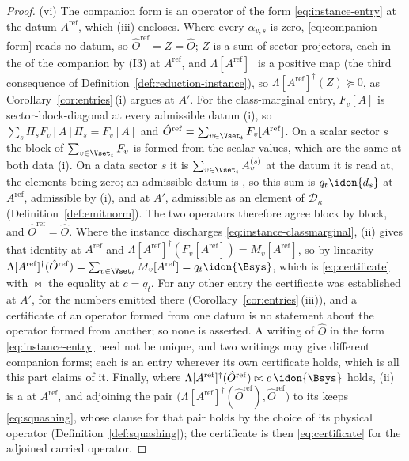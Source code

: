 \begin{proof}
(vi) The companion form is an operator of the form
\eqref{eq:instance-entry} at the datum $A^{\mathrm{ref}}$, which
(iii) encloses. Where every $\alpha_{v,s}$ is zero, \eqref{eq:companion-form}
reads no datum, so $\hat O^{\mathrm{ref}}=Z=\hat O$; $Z$ is a sum of sector
projectors, each in the  of the companion by (I3) at
$A^{\mathrm{ref}}$, and $\Lambda[A^{\mathrm{ref}}]^{\dagger}$ is a positive
map (the third consequence of Definition~\ref{def:reduction-instance}), so
$\Lambda[A^{\mathrm{ref}}]^{\dagger}(Z)\succeq0$, as
Corollary~\ref{cor:entries}\,(i) argues at $A'$. For the class-marginal
entry, $F_v[A]$ is sector-block-diagonal at every admissible datum (i), so
$\sum_s\Pi_sF_v[A]\Pi_s=F_v[A]$ and
$\hat O^{\mathrm{ref}}=\sum_{v\in\Vset_t}F_v[A^{\mathrm{ref}}]$. On a scalar
sector $s$ the block of $\sum_{v\in\Vset_t}F_v$ is formed from the scalar
values, which are the same at both data (i). On a data sector $s$ it is
$\sum_{v\in\Vset_t}A^{(s)}_v$ at the datum it is read at, the elements
 being zero; an admissible datum is
, so this sum is $q_t\idon{d_s}$ at $A^{\mathrm{ref}}$,
admissible by (i), and at $A'$, admissible as an element of
$\mathcal{D}_{\kappa}$ (Definition~\ref{def:emitnorm}). The two operators
therefore agree block by block, and $\hat O^{\mathrm{ref}}=\hat O$. Where
the instance discharges \eqref{eq:instance-classmarginal}, (ii) gives that
identity at $A^{\mathrm{ref}}$ and
$\Lambda[A^{\mathrm{ref}}]^{\dagger}(F_v[A^{\mathrm{ref}}])
=M_v[A^{\mathrm{ref}}]$, so by linearity
$\Lambda[A^{\mathrm{ref}}]^{\dagger}(\hat O^{\mathrm{ref}})
=\sum_{v\in\Vset_t}M_v[A^{\mathrm{ref}}]=q_t\idon{\Bsys}$, which is
\eqref{eq:certificate} with $\bowtie$ the equality at $c=q_t$. For any
other entry the certificate was established at $A'$, for the numbers
emitted there (Corollary~\ref{cor:entries}\,(iii)), and a certificate of an operator
formed from one datum is no statement about the operator formed from
another; so none is asserted. A writing of $\hat O$ in the form
\eqref{eq:instance-entry} need not be unique, and two writings may give
different companion forms; each is an entry wherever its own certificate
holds, which is all this part claims of it. Finally, where
$\Lambda[A^{\mathrm{ref}}]^{\dagger}(\hat O^{\mathrm{ref}})\bowtie
c\,\idon{\Bsys}$ holds, (ii) is a  at
$A^{\mathrm{ref}}$, and adjoining the pair
$\big(\Lambda[A^{\mathrm{ref}}]^{\dagger}(\hat O^{\mathrm{ref}}),
\hat O^{\mathrm{ref}}\big)$ to its  keeps
\eqref{eq:squashing}, whose clause for that pair holds by the choice of its
physical operator (Definition~\ref{def:squashing}); the certificate is then
\eqref{eq:certificate} for the adjoined carried operator.
\end{proof}
